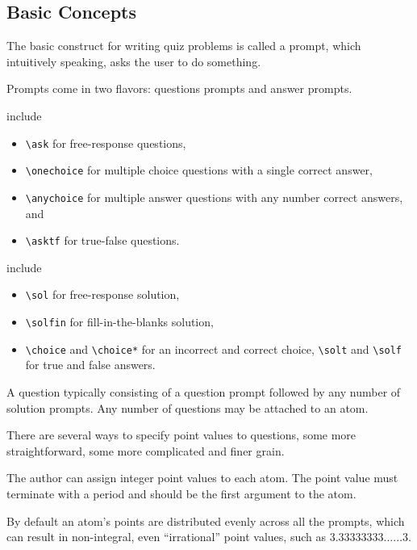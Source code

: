 \subsection{Basic Concepts}
The basic construct for writing quiz problems is called a  prompt, which intuitively speaking, asks the user to do something.


\begin{gram}[Prompts]
Prompts come in two flavors: questions prompts and answer prompts.
%

  include 
%
\begin{itemize}
\item \lstinline`\ask` for free-response questions, 
%
\item \lstinline`\onechoice` for multiple choice questions with a single correct answer, 
%
\item \lstinline`\anychoice` for multiple answer questions with any number correct answers, and 
%
\item \lstinline`\asktf` for true-false questions.
\end{itemize}

  include 
%
\begin{itemize}

\item \lstinline`\sol` for free-response solution, 
%
\item \lstinline`\solfin` for fill-in-the-blanks solution, 
%
\item \lstinline`\choice` and \lstinline`\choice*` for an incorrect and correct choice, 
%
\lstinline`\solt` and \lstinline`\solf`   for true and false answers.
\end{itemize}

A question typically consisting of a question prompt followed by any
number of solution prompts.  
%
Any number of questions may be attached  to an atom.
\end{gram}

%

\begin{gram}
There are several ways to specify point values to questions, some more
straightforward, some more complicated and finer grain.

The author can assign integer point values to each atom. 
%
The point value must terminate with a period and should be the first argument to the atom.
%

By default an atom's points are distributed evenly across all the
prompts, which can result in non-integral, even ``irrational'' point
values, such as $3.33333333...\ldots 3$.  
%
\end{gram}

